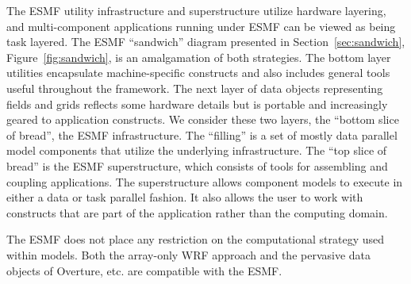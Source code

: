 The ESMF utility infrastructure and superstructure utilize hardware layering, 
and multi-component applications running under ESMF can be viewed as 
being task layered.  The ESMF ``sandwich'' diagram presented in 
Section~\ref{sec:sandwich}, Figure~\ref{fig:sandwich}, is an amalgamation 
of both strategies.  The bottom layer utilities encapsulate 
machine-specific constructs and also includes general tools useful throughout
the framework.  The next layer of data objects representing
fields and grids reflects some hardware details but is portable and increasingly
geared to application constructs.  We consider these two layers, the ``bottom
slice of bread'', the ESMF infrastructure.  The ``filling'' is a set of 
mostly data parallel model components that utilize the underlying 
infrastructure.  The ``top slice of bread'' is the ESMF superstructure, 
which consists of tools for assembling and coupling applications.  The 
superstructure allows component models to execute in either a data or task 
parallel fashion.  It also allows the user to work with constructs that are part
of the application rather than the computing domain.  

The ESMF does not place any restriction on the computational strategy used 
within models.  Both the array-only WRF approach and the pervasive data 
objects of Overture, etc. are compatible with the ESMF.





